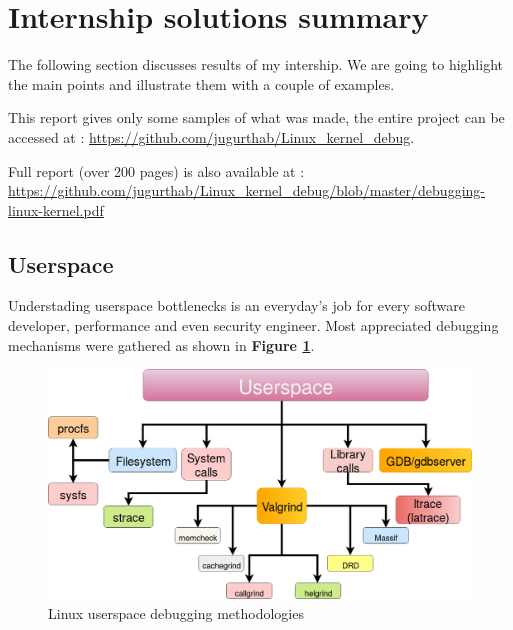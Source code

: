 \section{Internship solutions summary}
The following section discusses results of my intership. We are going to highlight the main points and illustrate them with a couple of examples.

\begin{center}
\begin{mdframed}[
        linecolor=red,linewidth=2pt,%
        frametitlerule=true,%
        apptotikzsetting={\tikzset{mdfframetitlebackground/.append style={%
            shade,left color=white, right color=blue!20}}}, 
        frametitlerulecolor=blue,
        frametitlerulewidth=1pt, innertopmargin=\topskip,
        frametitle={About report},
        outerlinewidth=1.25pt
    ]
			This report gives only some samples of what was made, the entire project can be accessed at : {\color{blue}\url{https://github.com/jugurthab/Linux_kernel_debug}}.
			
			Full report (over 200 pages) is also available at : {\color{blue}\url{https://github.com/jugurthab/Linux_kernel_debug/blob/master/debugging-linux-kernel.pdf}}
\end{mdframed}
\end{center}




\subsection{Userspace}
Understading userspace bottlenecks is an everyday's job for every software developer, performance and even security engineer. Most appreciated debugging mechanisms were gathered as shown in \textbf{Figure \ref{Linux userspace debugging methodologies}}.
	\begin{figure}[H]
		\centering
        \includegraphics[scale=0.40]{img/solution/userspace.png}
        \caption{Linux userspace debugging methodologies}
        \label{Linux userspace debugging methodologies}
    \end{figure}
 
